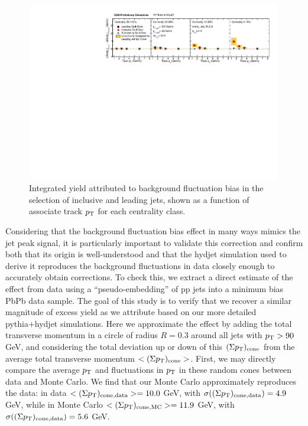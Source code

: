        
                  \begin{figure}[h!]
                  \begin{center}\includegraphics[width=0.99\textwidth]{figures/JFF_SpillOver/Integral_Closure_pT_Leading.pdf}
                  \caption[Integrated yield attributed to background fluctuation bias as a function of $p_{\rm T}^{\rm trk}$]{Integrated yield attributed to background fluctuation bias in the selection of inclusive and leading jets, shown as a function of associate track $p_{\rm T}$ for each centrality class.}
                    \label{fig:closure_integrals_pT}
                    \end{center}
                    \end{figure}
                    

Considering that the background fluctuation bias effect in many ways mimics the jet peak signal, it is particularly important to validate this correction and confirm both that its origin is well-understood and that the {\sc hydjet} simulation used to derive it reproduces the background fluctuations in data closely enough to accurately obtain corrections.  To check this, we extract a direct estimate of the effect from data using a ``pseudo-embedding'' of pp jets into a minimum bias PbPb data sample.  The goal of this study is to verify that we recover a similar magnitude of excess yield as we attribute based on our more detailed {\sc pythia+hydjet} simulations.  Here we approximate the effect by adding the total transverse momentum in a circle of radius  $R = 0.3$ around all jets with $p_{\rm T} > 90$ GeV, and considering the total deviation up or down of this $(\Sigma p_{\rm T})_{\rm cone}$ from the average total transverse momentum $< (\Sigma p_{\rm T})_{\rm cone}>$.  First, we may directly compare the average $p_{\rm T}$ and fluctuations in $p_{\rm T}$ in these random cones between data and Monte Carlo.  We find that our Monte Carlo approximately reproduces the data:  in data $< (\Sigma p_{\rm T})_{\rm cone, data}> = 10.0$ GeV, with $\sigma((\Sigma p_{\rm T})_{\rm cone, data}) = 4.9$ GeV, while in Monte Carlo $< (\Sigma p_{\rm T})_{\rm cone, MC}> = 11.9$ GeV, with $\sigma((\Sigma p_{\rm T})_{\rm cone, data}) = 5.6$ GeV. 

